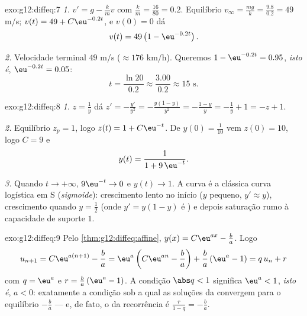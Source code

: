 \begin{solution}{exo:g12:diffeq:7}
\emph{1.} $v' = g - \frac{k}{m} v$ com
$\frac km = \frac{16}{80} = 0.2$. Equilíbrio
$v_\infty = \frac{mg}{k} = \frac{9.8}{0.2} = 49$ m/s;
$v(t) = 49 + C\eu^{-0.2t}$, e $v(0) = 0$ dá
\[
v(t) = 49\left(1 - \eu^{-0.2 t}\right).
\]

\emph{2.} Velocidade terminal $49$ m/s ($\approx 176$ km/h). Queremos
$1 - \eu^{-0.2t} = 0.95$, \emph{isto é}, $\eu^{-0.2t} = 0.05$:
\[
t = \frac{\ln 20}{0.2} \approx \frac{3.00}{0.2} \approx 15 \text{ s}.
\]
\end{solution}

\begin{solution}{exo:g12:diffeq:8}
\emph{1.} $z = \frac1y$ dá
$z' = -\frac{y'}{y^2} = -\frac{y(1-y)}{y^2} = -\frac{1-y}{y}
= -\frac1y + 1 = -z + 1$.

\emph{2.} Equilíbrio $z_p = 1$, logo $z(t) = 1 + C\eu^{-t}$. De
$y(0) = \frac{1}{10}$ vem $z(0) = 10$, logo $C = 9$ e
\[
y(t) = \frac{1}{1 + 9\,\eu^{-t}} .
\]

\emph{3.} Quando $t \to +\infty$, $9\eu^{-t} \to 0$ e $y(t) \to 1$. A
curva é a clássica curva logística em S (\emph{sigmoide}): crescimento
lento no início ($y$ pequeno, $y' \approx y$), crescimento  quando
$y = \frac12$ (onde $y' = y(1-y)$ é ) e depois saturação rumo à
capacidade de suporte $1$.
\end{solution}

\begin{solution}{exo:g12:diffeq:9}
Pelo \cref{thm:g12:diffeq:affine}, $y(x) = C\eu^{ax} - \frac ba$. Logo
\[
u_{n+1} = C\eu^{a(n+1)} - \frac ba
= \eu^{a}\left(C\eu^{an} - \frac ba\right) + \frac ba\left(\eu^a - 1\right)
= q\,u_n + r
\]
com $q = \eu^{a}$ e $r = \frac{b}{a}\left(\eu^{a} - 1\right)$. A condição
$\abs q < 1$ significa $\eu^a < 1$, \emph{isto é}, $a < 0$: exatamente a
condição sob a qual as soluções da  convergem para o
equilíbrio $-\frac ba$ --- e, de fato, o  da recorrência é
$\frac{r}{1 - q} = -\frac{b}{a}$.
\end{solution}

